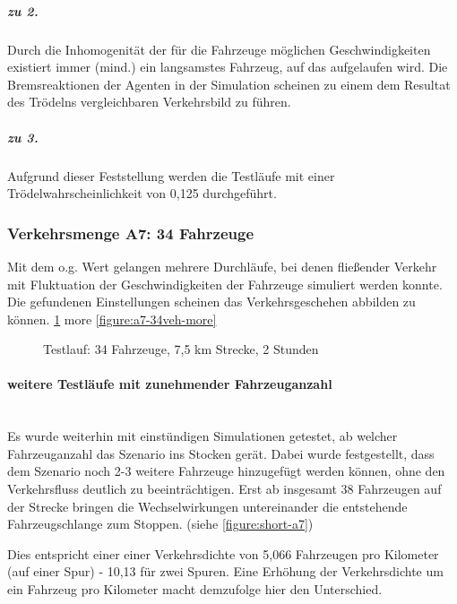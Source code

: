 \subparagraph*{zu 2.} Durch die Inhomogenität der für die Fahrzeuge möglichen Geschwindigkeiten existiert immer (mind.) ein langsamstes Fahrzeug, auf das aufgelaufen wird.
Die Bremsreaktionen der Agenten in der Simulation scheinen zu einem dem Resultat des Trödelns vergleichbaren Verkehrsbild zu führen.

\subparagraph*{zu 3.} Aufgrund dieser Feststellung werden die Testläufe mit einer Trödelwahrscheinlichkeit von 0,125 durchgeführt.



\subsubsection{Verkehrsmenge A7: 34 Fahrzeuge}
\label{sec:szenario-a7}

Mit dem o.g. Wert gelangen mehrere Durchläufe, bei denen fließender Verkehr mit Fluktuation der Geschwindigkeiten der Fahrzeuge simuliert werden konnte.
Die gefundenen Einstellungen scheinen das Verkehrsgeschehen abbilden zu können.
\cref{figure:testrun-34veh-7ko5km}
more \cref{figure:a7-34veh-more}

\begin{figure}[hptb]
  \centering 
   \qquad 
  \caption{Testlauf: 34 Fahrzeuge, 7,5 km Strecke, 2 Stunden} 
  \label{figure:testrun-34veh-7ko5km}
\end{figure}

\paragraph*{weitere Testläufe mit zunehmender Fahrzeuganzahl}
\hfill \\

Es wurde weiterhin mit einstündigen Simulationen getestet, ab welcher Fahrzeuganzahl das Szenario ins Stocken gerät.
Dabei wurde festgestellt, dass dem Szenario noch 2-3 weitere Fahrzeuge hinzugefügt werden können, ohne den Verkehrsfluss deutlich zu beeinträchtigen.
Erst ab insgesamt 38 Fahrzeugen auf der Strecke bringen die Wechselwirkungen untereinander die entstehende Fahrzeugschlange zum Stoppen. (siehe \cref{figure:short-a7})

Dies entspricht einer einer Verkehrsdichte von 5,066 Fahrzeugen pro Kilometer (auf einer Spur) - 10,13 für zwei Spuren.
Eine Erhöhung der Verkehrsdichte um ein Fahrzeug pro Kilometer macht demzufolge hier den Unterschied.




